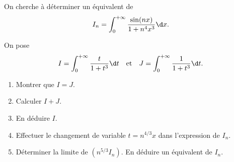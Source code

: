 \begin{enonce}
\begin{exercise}[ID={RMS135 E1474},subtitle={IMT MP 2024},tags={},difficulty={}]

On cherche à déterminer un équivalent de
\begin{equation*}
I_n = \int_0^{+\infty} \frac{\sin(nx)}{1 + n^4 x^3}  \d x.
\end{equation*}

On pose 
\[
I = \int_0^{+\infty} \frac{t}{1 + t^3} \d t
\quad \text{et} \quad
J = \int_0^{+\infty} \frac{1}{1 + t^3} \d t.
\]

\begin{enumerate}
  \item Montrer que $I = J$.
  \item Calculer $I + J$.
  \item En déduire $I$.
  \item Effectuer le changement de variable $t = n^{4/3} x$ dans l’expression de $I_n$.
  \item Déterminer la limite de $\left(n^{5/3} I_n\right)$.
    En déduire un équivalent de $I_n$.
\end{enumerate}

\end{exercise}
\begin{solution}
\end{solution}
\end{enonce}
